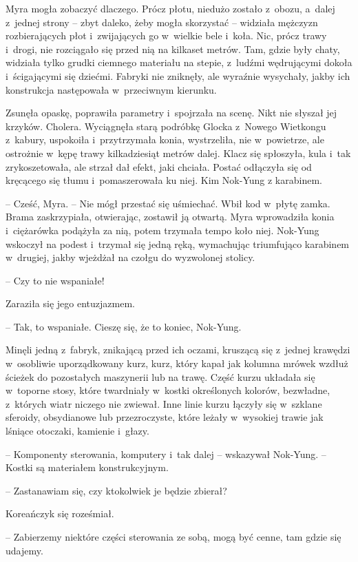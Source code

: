 \documentclass[oneside,polish,11pt,sfheadings]{mwbk}
\begin{document}
Myra mogła zobaczyć dlaczego. Prócz płotu, niedużo zostało z~obozu, a~dalej z~jednej strony -- zbyt daleko, żeby mogła skorzystać -- widziała
mężczyzn rozbierających płot i~zwijających go w~wielkie bele i~koła.
Nic, prócz trawy i~drogi, nie rozciągało się przed nią na kilkaset
metrów. Tam, gdzie były chaty, widziała tylko grudki ciemnego materiału
na stepie, z~ludźmi wędrującymi dokoła i~ścigającymi się dziećmi.
Fabryki nie zniknęły, ale wyraźnie wysychały, jakby ich konstrukcja
następowała w~przeciwnym kierunku.

Zsunęła opaskę, poprawiła parametry i~spojrzała na scenę. Nikt nie
słyszał jej krzyków. Cholera. Wyciągnęła starą podróbkę Glocka z~Nowego
Wietkongu z~kabury, uspokoiła i~przytrzymała konia, wystrzeliła, nie w~powietrze, ale ostrożnie w~kępę trawy kilkadziesiąt metrów dalej. Klacz
się spłoszyła, kula i~tak zrykoszetowała, ale strzał dał efekt, jaki
chciała. Postać odłączyła się od kręcącego się tłumu i~pomaszerowała ku
niej. Kim Nok-Yung z karabinem.

-- Cześć, Myra. -- Nie mógł przestać się uśmiechać. Wbił kod w~płytę
zamka. Brama zaskrzypiała, otwierając, zostawił ją otwartą. Myra
wprowadziła konia i~ciężarówka podążyła za nią, potem trzymała tempo
koło niej. Nok-Yung wskoczył na podest i~trzymał się jedną ręką,
wymachując triumfująco karabinem w~drugiej, jakby wjeżdżał na czołgu do
wyzwolonej stolicy.

-- Czy to nie wspaniałe!

Zaraziła się jego entuzjazmem.

-- Tak, to wspaniałe. Cieszę się, że to koniec, Nok-Yung.

Minęli jedną z~fabryk, znikającą przed ich oczami, kruszącą się z~jednej
krawędzi w~osobliwie uporządkowany kurz, kurz, który kapał jak kolumna
mrówek wzdłuż ścieżek do pozostałych maszynerii lub na trawę. Część
kurzu układała się w~toporne stosy, które twardniały w~kostki
określonych kolorów, bezwładne, z~których wiatr niczego nie zwiewał.
Inne linie kurzu łączyły się w~szklane sferoidy, obsydianowe lub
przezroczyste, które leżały w~wysokiej trawie jak lśniące otoczaki,
kamienie i~głazy.

-- Komponenty sterowania, komputery i~tak dalej -- wskazywał Nok-Yung. -- Kostki są materiałem konstrukcyjnym.

-- Zastanawiam się, czy ktokolwiek je będzie zbierał?

Koreańczyk się roześmiał. 

-- Zabierzemy niektóre części sterowania ze
sobą, mogą być cenne, tam gdzie się udajemy.
\end{document}
